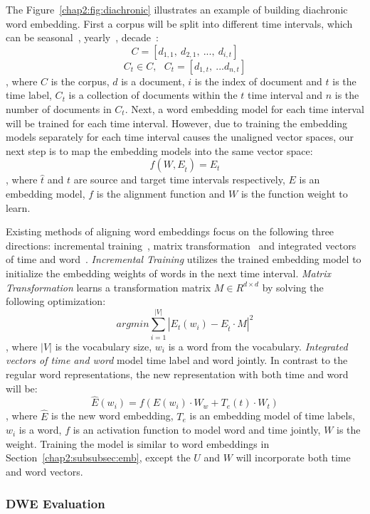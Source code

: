 The Figure~\ref{chap2:fig:diachronic} illustrates an example of building diachronic word embedding.
First a corpus will be split into different time intervals, which can be seasonal~\cite{huang2018examining}, yearly~\cite{yao2018dynamic}, decade~\cite{hamilton2016diachronic}:
$$C = [d_{1, 1}, ~d_{2, 1}, ~..., ~d_{i, t}] $$
$$C_t \in C, ~~~ C_t = [d_{1, t},~ ...d_{n, t}]$$
, where $C$ is the corpus, $d$ is a document, $i$ is the index of document and $t$ is the time label, $C_t$ is a collection of documents within the $t$ time interval and $n$ is the number of documents in $C_t$.
Next, a word embedding model for each time interval will be trained for each time interval.
However, due to training the embedding models separately for each time interval causes the unaligned vector spaces, our next step is to map the embedding models into the same vector space:
$$f(W, E_{\hat{t}}) = E_t$$
, where $\hat{t}$ and $t$ are source and target time intervals respectively, $E$ is an embedding model, $f$ is the alignment function and $W$ is the function weight to learn.

Existing methods of aligning word embeddings focus on the following three directions: incremental training~\cite{kim2014temporal}, matrix transformation~\cite{kulkarni2015statistically, hamilton2016diachronic, yao2018dynamic} and integrated vectors of time and word~\cite{rosenfeld2018deep, huang2019neural}. \textit{Incremental Training} utilizes the trained embedding model to initialize the embedding weights of words in the next time interval.
\textit{Matrix Transformation} learns a transformation matrix $M \in R^{d \times d}$ by solving the following optimization:
$$argmin \sum_{i=1}^{|V|}|E_t(w_i) - E_{\hat{t}} \cdot M|^2$$
, where $|V|$ is the vocabulary size, $w_i$ is a word from the vocabulary.
\textit{Integrated vectors of time and word} model time label and word jointly. In contrast to the regular word representations, the new representation with both time and word will be:
$$\hat{E}(w_i) = f(E(w_i) \cdot W_w + T_e(t) \cdot W_t)$$
, where $\hat{E}$ is the new word embedding, $T_e$ is an embedding model of time labels, $w_i$ is a word, $f$ is an activation function to model word and time jointly, $W$ is the weight.
Training the model is similar to word embeddings in Section~\ref{chap2:subsubsec:emb}, except the $U$ and $W$ will incorporate both time and word vectors.


\subsubsection{DWE Evaluation}

